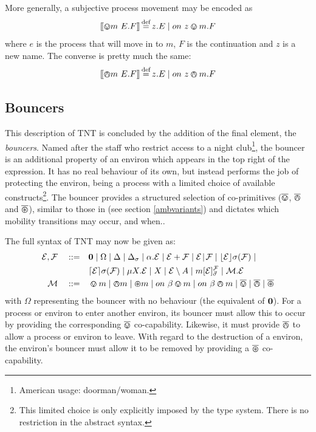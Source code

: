 More generally, a subjective process movement may be encoded as
\begin{equation}
[\hspace{-0.3ex}[ \varovee m\ {E}.F ]\hspace{-0.3ex}] \operatorname{\stackrel{\textrm{def}}{=}} z.E \;|\; on\ z \varovee m.F
\end{equation}
where $e$ is the process that will move in to $m$, $F$ is
the continuation and $z$ is a new name.  The converse is pretty much the same:
\begin{equation}
[\hspace{-0.3ex}[ \varowedge m\ {E}.F ]\hspace{-0.3ex}] \operatorname{\stackrel{\textrm{def}}{=}} z.E \;|\; on\ z \varowedge m.F
\end{equation}

\subsection{Bouncers}
\label{bouncers}

This description of TNT is concluded by the addition of the final
element, the \emph{bouncers}.  Named after the staff who
restrict access to a night club\footnote{American usage:
doorman/woman.}, the bouncer is an additional property of an environ
which appears in the top right of the expression.  It has no real
behaviour of its own, but instead performs the job of protecting the
environ, being a process with a limited choice of available
constructs\footnote{This limited choice is only explicitly imposed by
the type system.  There is no restriction in the abstract syntax.}.  The
bouncer provides a structured selection of co-primitives ($\overline{\varovee}$,
$\overline{\varowedge}$ and $\overline{\varoast}$), similar to those in \cite{sangiorgi:mobsafeambients} (see section \ref{ambvariants}) and dictates which mobility transitions may
occur, and when..

The full syntax of TNT may now be given as:
\begin{equation}
  \begin{aligned}
    \text{$\mathcal{E}$}, \text{$\mathcal{F}$} \quad \mathrel{::=} \quad &
      \textbf{0}  \mid
      \Omega \mid
      \Delta \mid
      \Delta_{\sigma} \mid
      \alpha . \text{$\mathcal{E}$}  \mid
      \text{$\mathcal{E}$} + \text{$\mathcal{F}$} \mid
      \text{$\mathcal{E}$} \mathrel{\!|\!} \text{$\mathcal{F}$} \mid
      \lfloor{\text{$\mathcal{E}$}}\rfloor {\sigma} ({\text{$\mathcal{F}$}}) \mid \\
    & \lceil{\text{$\mathcal{E}$}}\rceil {\sigma} ({\text{$\mathcal{F}$}}) \mid 
      \mu X . \text{$\mathcal{E}$} \mid
      X \mid 
      \text{$\mathcal{E}$} \setminus {A} \mid
      {m}[ \text{$\mathcal{E}$} ]^{\text{$\mathcal{F}$}}_{\vec{\sigma}} \mid
      \text{$\mathcal{M}$} . \text{$\mathcal{E}$} \\
   \text{$\mathcal{M}$} \quad \mathrel{::=} \quad & \varovee m \mid \varowedge m \mid \varoast m \mid
      on\ \beta \varovee m \mid on\ \beta \varowedge m \mid \overline{\varovee} \mid
      \overline{\varowedge} \mid \overline{\varoast}
   \end{aligned}
   \label{eqn:tnt-syntax}
\end{equation}
with $\Omega$ representing the bouncer with no behaviour (the
equivalent of $\textbf{0}$).  For a process or environ to enter another
environ, its bouncer must allow this to occur by providing the
corresponding $\overline{\varovee}$ co-capability.  Likewise, it must provide $\overline{\varowedge}$
to allow a process or environ to leave.  With regard to the destruction
of a environ, the environ's bouncer must allow it to be removed by
providing a $\overline{\varoast}$ co-capability.

